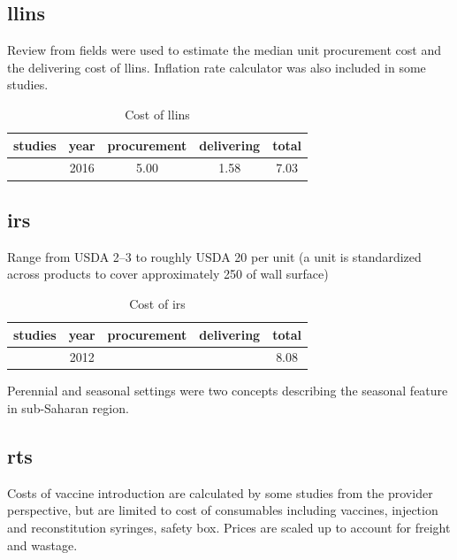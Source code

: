 \documentclass[a4paper, 12pt, twoside]{article}
\begin{document}
\subsection{\texorpdfstring{\gls{llins}}{LLINs}}
Review from fields were used to estimate the median unit procurement cost and the delivering cost of \gls{llins}.
Inflation rate calculator was also included in some studies\cite{Walker2016}.

\begin{table}[htpb]
	\centering
	\caption{Cost of \gls{llins}}
	\label{tab:cost_of_llins}
	\begin{tabular}{cSSSS}
		\toprule
		studies           & {year} & {procurement} & {delivering} & {total} \\
		\midrule
		\cite{Walker2016} & 2016   & 5.00          & 1.58         & 7.03    \\
		\bottomrule
	\end{tabular}
\end{table}

\subsection{\texorpdfstring{\gls{irs}}{IRS}}
Range from USDA 2–3 to roughly USDA 20 per unit\cite{Oxborough2016}
(a unit is standardized across products to cover approximately 250 of wall surface)

\begin{table}[htpb]
	\centering
	\caption{Cost of \gls{irs}}
	\label{tab:cost_of_irs}
	\begin{tabular}{cSSSS}
		\toprule
		studies           & {year} & {procurement} & {delivering} & {total} \\
		\midrule
		\cite{Walker2016} & 2012   &               &              & 8.08    \\
		\bottomrule
	\end{tabular}
\end{table}

Perennial and seasonal settings were two concepts describing the seasonal feature in sub-Saharan region.

\subsection{\texorpdfstring{\gls{rts}}{RTS}}%
\label{sub:rts}
Costs of vaccine introduction are calculated by some studies\cite{Hay2004} from the provider perspective, but are limited to cost of
consumables including vaccines, injection and reconstitution syringes, safety box.
Prices are scaled up to account for freight\cite{Winskill2017a} and wastage\cite{Hutton2006}.
\end{document}
